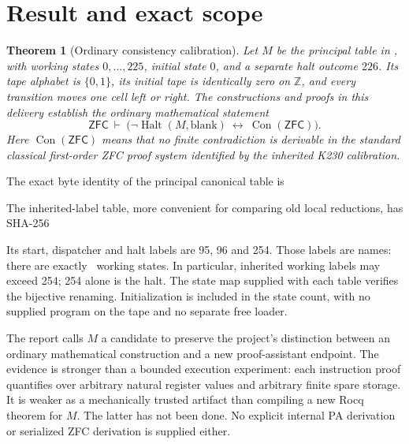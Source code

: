 \documentclass[11pt,a4paper]{article}
\newtheorem{theorem}{Theorem}
\newcommand{\Con}{\operatorname{Con}}
\newcommand{\Halt}{\operatorname{Halt}}
\newcommand{\ZFC}{\mathsf{ZFC}}
\newcommand{\artifact}[1]{\texttt{\detokenize{#1}}}
\begin{document}
\begingroup
\small
\setlength{\parskip}{0pt}
\tableofcontents
\endgroup
\clearpage

\section{Result and exact scope}

\begin{theorem}[Ordinary consistency calibration]
Let $M$ be the principal table in \artifact{machines/k226.tm}, with
working states $0,\ldots,225$, initial state $0$, and a separate halt
outcome $226$. Its tape alphabet is $\{0,1\}$, its initial tape is
identically zero on $\mathbb Z$, and every transition moves one cell
left or right. The constructions and proofs in this delivery establish
the ordinary mathematical statement
\[
 \ZFC\ \vdash\
 \bigl(\neg\Halt(M,\mathrm{blank})\ \longleftrightarrow\ \Con(\ZFC)\bigr).
\]
Here $\Con(\ZFC)$ means that no finite contradiction is derivable in
the standard classical first-order ZFC proof system identified by the
inherited K230 calibration.
\end{theorem}

The exact byte identity of the principal canonical table is
\begin{center}\small\ttfamily\CanonicalHash\end{center}
The inherited-label table, more convenient for comparing old local
reductions, has SHA-256
\begin{center}\small\ttfamily\InheritedHash\end{center}
Its start, dispatcher and halt labels are 95, 96 and 254. Those labels
are names: there are exactly \CandidateStates\ working states. In
particular, inherited working labels may exceed 254; 254 alone is the halt.
The state map supplied with each table verifies the bijective renaming.
Initialization is included in the state count, with no supplied program
on the tape and no separate free loader.

The report calls $M$ a candidate to preserve the project's distinction
between an ordinary mathematical construction and a new proof-assistant
endpoint. The evidence is stronger than a bounded execution experiment:
each instruction proof quantifies over arbitrary natural register values
and arbitrary finite spare storage. It is weaker as a mechanically
trusted artifact than compiling a new Rocq theorem for $M$. The latter
has not been done. No explicit internal PA derivation or serialized
ZFC derivation is supplied either.
\end{document}
